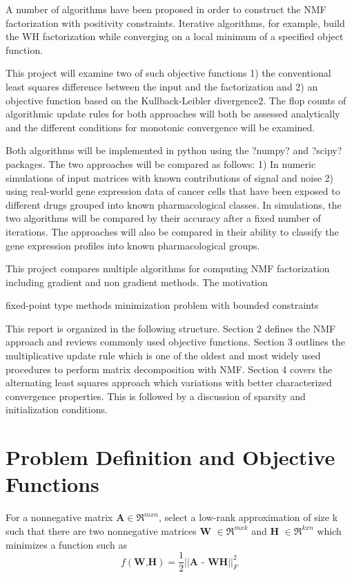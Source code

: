 \documentclass[final,leqno,onefignum,onetabnum]{siamltex1213}
\begin{document}
A number of algorithms have been proposed in order to construct the NMF factorization with positivity constraints. Iterative algorithms, for example, build the WH factorization while converging on a local minimum of a specified object function. 


This project will examine two of such objective functions 1) the conventional least squares difference between the input and the factorization and 2) an objective function based on the Kullback-Leibler divergence2. The flop counts of algorithmic update rules for both approaches will both be assessed analytically and the different conditions for monotonic convergence will be examined. 


Both algorithms will be implemented in python using the ?numpy? and ?scipy? packages. The two approaches will be compared as follows: 1) In numeric simulations of input matrices with known contributions of signal and noise 2) using real-world gene expression data of cancer cells that have been exposed to different drugs grouped into known pharmacological classes. In simulations, the two algorithms will be compared by their accuracy after a fixed number of iterations. The approaches will also be compared in their ability to classify the gene expression profiles into known pharmacological groups.

This project compares multiple algorithms for computing NMF factorization including gradient and non gradient methods. The motivation 

fixed-point type methods 
minimization problem with bounded constraints 


This report is organized in the following structure. Section 2 defines the NMF approach and reviews commonly used objective functions. Section 3 outlines the multiplicative update rule which is one of the oldest and most widely used procedures to perform matrix decomposition with NMF. Section 4 covers the alternating least squares approach which variations with better characterized convergence properties. This is followed by a discussion of sparsity and initialization conditions. 


\section{Problem Definition and Objective Functions}

\begin{definition} For a nonnegative matrix $\textbf{A} \in \Re^{m x n} $, select a low-rank approximation of size k such that there are two nonnegative matrices \textbf{W} $ \in \Re^{m x k}$ and \textbf{H} $ \in \Re^{k x n}$ which minimizes a function such as 
\begin{equation}\label{ObjEuc}
 f( \textbf{W,H}) = \frac{1}{2} || \textbf{A - WH} || ^{2}_{F}
\end{equation}

\end{definition}
\end{document}
